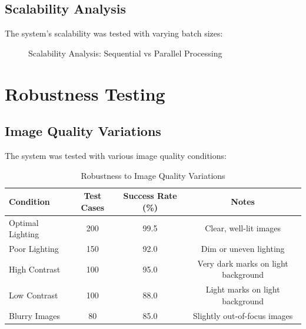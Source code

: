 \subsection{Scalability Analysis}

The system's scalability was tested with varying batch sizes:

\begin{figure}[H]
\centering
{}
\caption{Scalability Analysis: Sequential vs Parallel Processing}
\label{fig:scalability}
\end{figure}

\section{Robustness Testing}

\subsection{Image Quality Variations}

The system was tested with various image quality conditions:

\begin{table}[H]
\centering
\caption{Robustness to Image Quality Variations}
\begin{tabular}{|l|c|c|c|}
\hline
\textbf{Condition} & \textbf{Test Cases} & \textbf{Success Rate (\%)} & \textbf{Notes} \\
\hline
Optimal Lighting & 200 & 99.5 & Clear, well-lit images \\
Poor Lighting & 150 & 92.0 & Dim or uneven lighting \\
High Contrast & 100 & 95.0 & Very dark marks on light background \\
Low Contrast & 100 & 88.0 & Light marks on light background \\
Blurry Images & 80 & 85.0 & Slightly out-of-focus images \\
\hline
\end{tabular}
\label{tab:robustness_quality}
\end{table}


